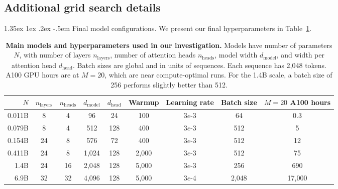 \documentclass[dvipsnames,11pt]{article}
\makeatletter
\renewcommand\paragraph{\@startsection{paragraph}{4}{\z@}                                     {1.35ex \@plus1ex \@minus.2ex}                                {-.5em}
{\normalfont\normalsize\bfseries}}
\makeatother
\begin{document}
\begin{appendix}
\section{Additional grid search details}
\label{appx:additional_training}

\paragraph{Final model configurations.}
We present our final hyperparameters in Table~\ref{tab:hparams}.
\begin{table}[tp]
    \centering
    \small
    \caption{\textbf{Main models and hyperparameters used in our investigation.} Models have number of parameters $N$, with number of layers $n_{\text{layers}}$, number of attention heads $n_{\text{heads}}$, model width $d_{\text{model}}$, and width per attention head $d_{\text{head}}$. Batch sizes are global and in units of sequences. Each sequence has 2,048 tokens.
    A100 GPU hours are at $M=20$, which are near compute-optimal runs.
    For the 1.4B scale, a batch size of 256 performs slightly better than 512.
    }    
    \begin{tabular}{rcccccccc}
        \toprule
        $N$ & $n_{\text{layers}}$ & $n_{\text{heads}}$ & $d_{\text{model}}$ & $d_{\text{head}}$ & Warmup & Learning rate & Batch size & $M=20$ A100 hours\\\midrule
        0.011B & 8 & 4 & 96 & 24 & 100 & 3$e$-3 & 64 & 0.3 \\
        0.079B & 8 & 4 & 512 & 128 & 400 & 3$e$-3 & 512 & 5 \\    
        0.154B & 24 & 8 & 576 & 72 & 400 & 3$e$-3 & 512 & 12 \\     
        0.411B & 24 & 8 & 1,024 & 128 & 2,000 & 3$e$-3 & 512 & 75\\    
        1.4B & 24 & 16 & 2,048 & 128 & 5,000 & 3$e$-3 & 256 & 690\\
        6.9B & 32 & 32 & 4,096 & 128 & 5,000 & 3$e$-4 & 2,048 & 17,000 \\\bottomrule
    \end{tabular}    
    \label{tab:hparams}
\end{table}


\end{appendix}
\end{document}
